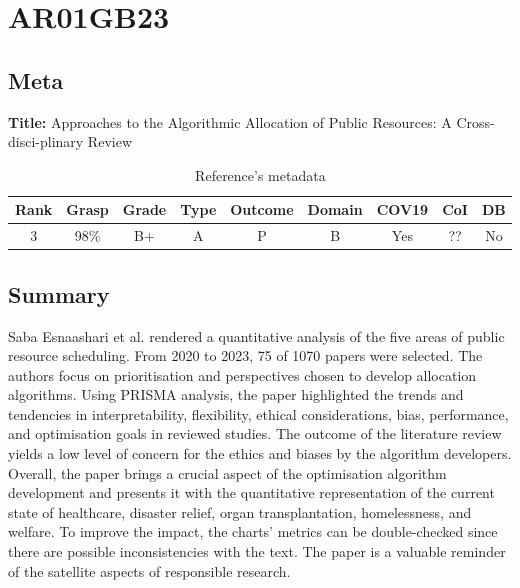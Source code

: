 \section{ AR01GB23 }


\subsection{Meta}

    \textbf{Title:}
    Approaches to the Algorithmic Allocation of Public Resources: A Cross-disci-plinary Review
    
    \begin{table}[H]
        \centering
        \begin{tabular}{|c|c|c|c|c|c|c|c|c|}
            \hline
                \textbf{Rank} & \textbf{Grasp} & \textbf{Grade} & \textbf{Type} & \textbf{Outcome} & \textbf{Domain} & \textbf{COV19} & \textbf{CoI} & \textbf{DB} \\
            \hline
                3 & 98\% & B+ & A & P & B & Yes & ?? & No \\
            \hline
        \end{tabular}
        \caption{Reference's metadata}
        \label{tab:AR01GB23}
    \end{table}

\subsection{Summary}
    Saba Esnaashari et al. \cite{x121} rendered a quantitative analysis of the five areas of public resource scheduling. From 2020 to 2023, 75 of 1070 papers were selected. The authors focus on prioritisation and perspectives chosen to develop allocation algorithms. Using PRISMA analysis, the paper highlighted the trends and tendencies in interpretability, flexibility, ethical considerations, bias, performance, and optimisation goals in reviewed studies. The outcome of the literature review yields a low level of concern for the ethics and biases by the algorithm developers. Overall, the paper brings a crucial aspect of the optimisation algorithm development and presents it with the quantitative representation of the current state of healthcare, disaster relief, organ transplantation, homelessness, and welfare. To improve the impact, the charts' metrics can be double-checked since there are possible inconsistencies with the text. The paper is a valuable reminder of the satellite aspects of responsible research.

